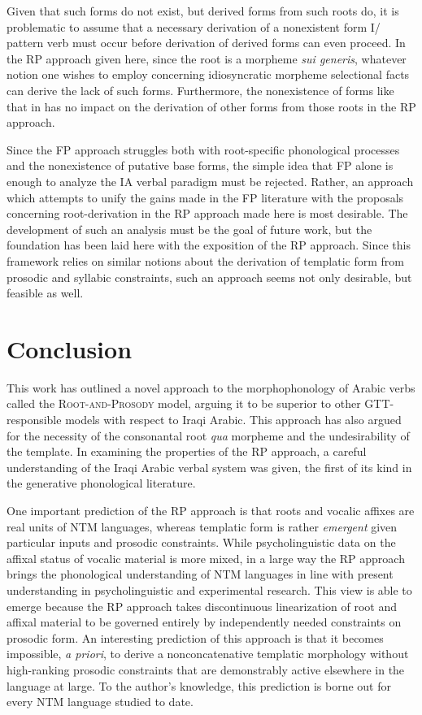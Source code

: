 \documentclass[12pt,twoside,letterpaper]{article}
\begin{document}
Given that such forms do not exist, but derived forms from such roots do, it is problematic to assume that a necessary derivation of a nonexistent form I/{\em {}} pattern verb must occur before derivation of derived forms can even proceed. In the RP approach given here, since the root is a morpheme \emph{sui generis}, whatever notion one wishes to employ concerning idiosyncratic morpheme selectional facts can derive the lack of such forms. Furthermore, the nonexistence of forms like that in \Last has no impact on the derivation of other forms from those roots in the RP approach.

Since the FP approach struggles both with root-specific phonological processes and the nonexistence of putative base forms, the simple idea that FP alone is enough to analyze the IA verbal paradigm must be rejected. Rather, an approach which attempts to unify the gains made in the FP literature with the proposals concerning root-derivation in the RP approach made here is most desirable. The development of such an analysis must be the goal of future work, but the foundation has been laid here with the exposition of the RP approach. Since this framework relies on similar notions about the derivation of templatic form from prosodic and syllabic constraints, such an approach seems not only desirable, but feasible as well.
 

\section{Conclusion}
\label{sec:conclusion}

This work has outlined a novel approach to the morphophonology of Arabic verbs called the \textsc{Root-and-Prosody} model, arguing it to be superior to other GTT-responsible models with respect to Iraqi Arabic. This approach has also argued for the necessity of the consonantal root \emph{qua} morpheme and the undesirability of the template. In examining the properties of the RP approach, a careful understanding of the Iraqi Arabic verbal system was given, the first of its kind in the generative phonological literature. 

One important prediction of the RP approach is that roots and vocalic affixes are real units of NTM languages, whereas templatic form is rather \emph{emergent} given particular inputs and prosodic constraints. While psycholinguistic data on the affixal status of vocalic material is more mixed, in a large way the RP approach brings the phonological understanding of NTM languages in line with present understanding in psycholinguistic and experimental research. This view is able to emerge because the RP approach takes discontinuous linearization of root and affixal material to be governed entirely by independently needed constraints on prosodic form. An interesting prediction of this approach is that it becomes impossible, \emph{a priori}, to derive a nonconcatenative templatic morphology without high-ranking prosodic constraints that are demonstrably active elsewhere in the language at large. To the author's knowledge, this prediction is borne out for every NTM language studied to date.
\end{document}

